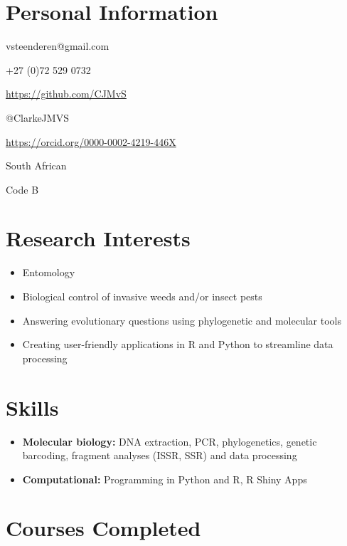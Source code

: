 \documentclass{article}
\begin{document}
\makecvtitle 

\section{Personal Information}
\begin{description}[widest=Driver's licence:]
\item[Email \Letter:] vsteenderen@gmail.com
\item[Cell \Telefon:] +27 (0)72 529 0732
\item[GitHub \faGithub:] \url{https://github.com/CJMvS}
\item[Twitter \faTwitter:] @ClarkeJMVS
\item[ORCID ID:] \url{https://orcid.org/0000-0002-4219-446X} 
\item[Citizenship:] South African
\item[Driver’s licence:] Code B
\end{description}

\section{Research Interests}

\begin{itemize}
\item Entomology
\item Biological control of invasive weeds and/or insect pests
\item Answering evolutionary questions using phylogenetic and molecular tools
\item Creating user-friendly applications in R and Python to streamline data processing

\end{itemize}

\section{Skills}

\begin{itemize}
\item \textbf{Molecular biology:} DNA extraction, PCR, phylogenetics, genetic barcoding, fragment analyses (ISSR, SSR) and data processing
\item \textbf{Computational:} Programming in Python and R, R Shiny Apps
\end{itemize}
 
\section{Courses Completed}
\end{document}
